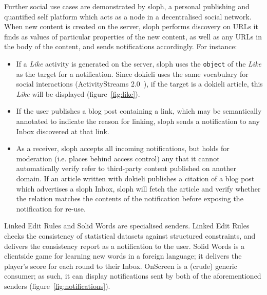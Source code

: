 \documentclass[a4paper]{llncs}
\begin{document}
\par Further social use cases are demonstrated by \empty sloph, a personal publishing and quantified self platform which acts as a node in a decentralised social network. When new content is created on the server, sloph performs discovery on URLs it finds as values of particular properties of the new content, as well as any URLs in the body of the content, and sends notifications accordingly. For instance:

                            \begin{itemize}
  \item If a {\em Like} activity is generated on the server, sloph uses the {\tt object} of the {\em Like} as the target for a notification. Since dokieli uses the same vocabulary for social interactions (\empty ActivityStreams 2.0~\cite{ref-18}), if the target is a dokieli article, this {\em Like} will be displayed (figure~\ref{fig:like}).\item If the user publishes a blog post containing a link, which may be semantically annotated to indicate the reason for linking, sloph sends a notification to any Inbox discovered at that link.\item As a receiver, sloph accepts all incoming notifications, but holds for moderation (i.e. places behind access control) any that it cannot automatically verify refer to third-party content published on another domain. If an article written with dokieli publishes a citation of a blog post which advertises a sloph Inbox, sloph will fetch the article and verify whether the relation matches the contents of the notification before exposing the notification for re-use.
    \end{itemize}



\par \empty Linked Edit Rules and \empty Solid Words are specialised senders. Linked Edit Rules checks the consistency of statistical datasets against structured constraints, and delivers the consistency report as a notification to the user. Solid Words is a clientside game for learning new words in a foreign language; it delivers the player’s score for each round to their Inbox. \empty OnScreen is a (crude) generic consumer; as such, it can display notifications sent by both of the aforementioned senders (figure~\ref{fig:notifications}).
\end{document}
